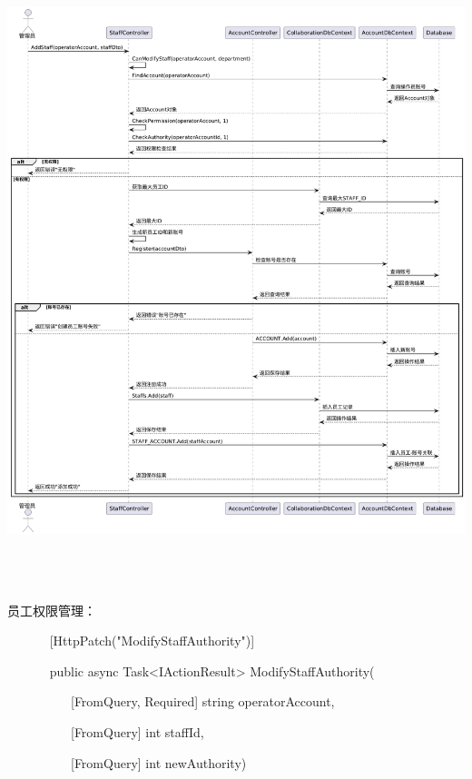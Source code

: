 \documentclass[]{article}
\begin{document}
\includegraphics[width=6.27778in,height=7.20903in]{media/media/image15.png}

员工权限管理：

~ ~ ~ ~ {[}HttpPatch("ModifyStaffAuthority"){]}

~ ~ ~ ~ public async Task\textless{}IActionResult\textgreater{}
ModifyStaffAuthority(

~ ~ ~ ~ ~ ~ {[}FromQuery, Required{]} string operatorAccount,

~ ~ ~ ~ ~ ~ {[}FromQuery{]} int staffId,

~ ~ ~ ~ ~ ~ {[}FromQuery{]} int newAuthority)
\end{document}
